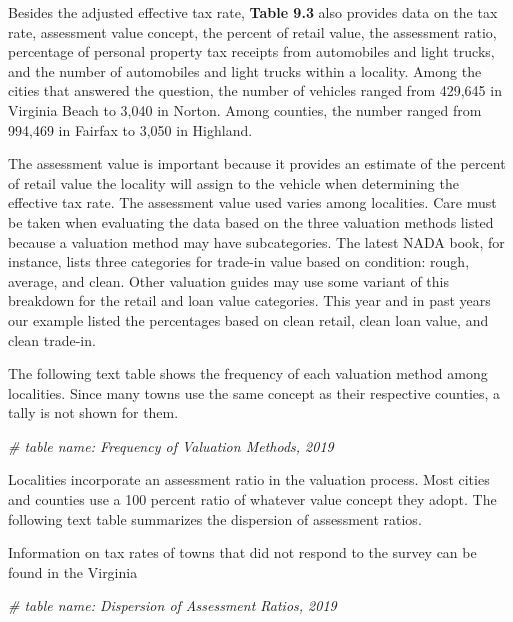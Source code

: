 \documentclass[
]{book}
\newenvironment{Shaded}{\begin{snugshade}}{\end{snugshade}}
\newcommand{\CommentTok}[1]{\textcolor[rgb]{0.56,0.35,0.01}{\textit{#1}}}
\begin{document}
Besides the adjusted effective tax rate, \textbf{Table 9.3} also provides data on the tax rate, assessment value concept, the percent of retail value, the assessment ratio, percentage of personal property tax receipts from automobiles and light trucks, and the number of automobiles and light trucks within a locality. Among the cities that answered the question, the number of vehicles ranged from 429,645 in Virginia Beach to 3,040 in Norton. Among counties, the number ranged from 994,469 in Fairfax to 3,050 in Highland.

The assessment value is important because it provides an estimate of the percent of retail value the locality will assign to the vehicle when determining the effective tax rate. The assessment value used varies among localities. Care must be taken when evaluating the data based on the three valuation methods listed because a valuation method may have subcategories. The latest NADA book, for instance, lists three categories for trade-in value based on condition: rough, average, and clean. Other valuation guides may use some variant of this breakdown for the retail and loan value categories. This year and in past years our example listed the percentages based on clean retail, clean loan value, and clean trade-in.

The following text table shows the frequency of each valuation method among localities. Since many towns use the same concept as their respective counties, a tally is not shown for them.

\begin{Shaded}
\begin{Highlighting}[]
\CommentTok{\# table name: Frequency of Valuation Methods, 2019}
\end{Highlighting}
\end{Shaded}

Localities incorporate an assessment ratio in the valuation process. Most cities and counties use a 100 percent ratio of whatever value concept they adopt. The following text table summarizes the dispersion of assessment ratios.

Information on tax rates of towns that did not respond to the survey can be found in the Virginia

\begin{Shaded}
\begin{Highlighting}[]
\CommentTok{\# table name: Dispersion of Assessment Ratios, 2019}
\end{Highlighting}
\end{Shaded}
\end{document}
